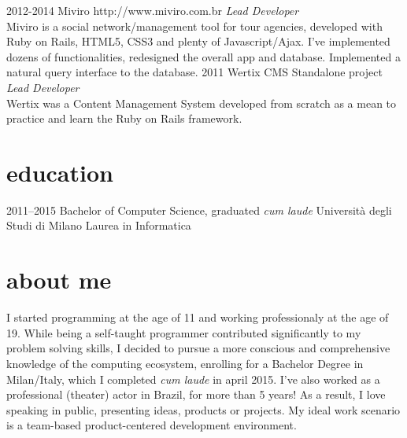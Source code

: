 \documentclass[]{friggeri-cv} %
\begin{document}
\begin{entrylist}
\entry
{2012-2014}
{Miviro}
{http://www.miviro.com.br}
{\emph{Lead Developer} \\
Miviro is a social network/management tool for tour agencies, developed with 
Ruby on Rails, HTML5, CSS3 and plenty of Javascript/Ajax. I've implemented 
dozens of functionalities, redesigned the overall app and database. 
Implemented a natural query interface to the database.
}
\entry
{2011}
{Wertix CMS}
{Standalone project}
{\emph{Lead Developer} \\
Wertix was a Content Management System developed from scratch as a mean to 
practice and learn the Ruby on Rails framework. %
}
\end{entrylist}


\section{education}
\begin{entrylist}
\entry
{2011--2015}
{Bachelor {\normalfont of Computer Science, graduated \textit{cum laude}}}
{Università degli Studi di Milano}
{Laurea in Informatica}
\end{entrylist}

\section{about me}
I started programming at the age of 11 and working professionaly at the age of 19. 
While being a self-taught programmer contributed significantly to my problem 
solving skills, I decided to pursue a more conscious and comprehensive 
knowledge of the computing ecosystem, enrolling for a Bachelor Degree in 
Milan/Italy, which I completed \textit{cum laude} in april 2015. I've also worked as a 
professional (theater) actor in Brazil, for more than 5 years! As a result, 
I love speaking in public, presenting ideas, products or projects. 
My ideal work scenario is a team-based product-centered development environment.
\end{document}
